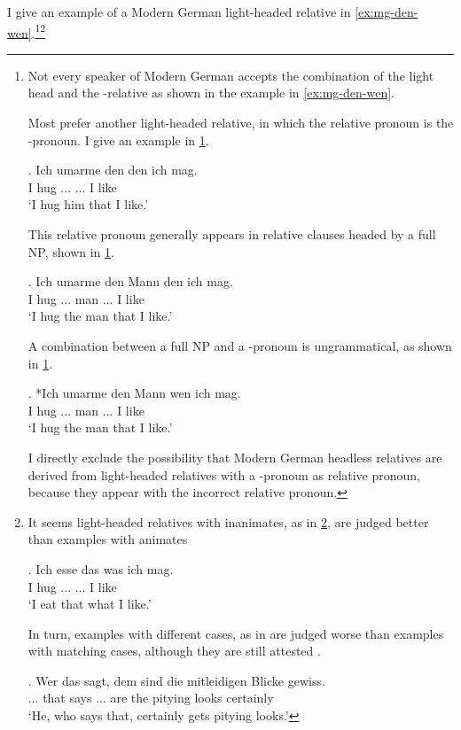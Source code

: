 I give an example of a Modern German light-headed relative in \ref{ex:mg-den-wen}.\footnote{
Not every speaker of Modern German accepts the combination of the light head  and the -relative  as shown in the example in \ref{ex:mg-den-wen}.

Most prefer another light-headed relative, in which the relative pronoun is the -pronoun. I give an example in \ref{ex:mg-den-den}.

\exg. Ich umarme den den ich mag.\\
I hug ... ... I like\\
`I hug him that I like.'\label{ex:mg-den-den}

This relative pronoun generally appears in relative clauses headed by a full NP, shown in \ref{ex:mg-den-headed}.

\exg. Ich umarme den Mann den ich mag.\\
I hug ... man ... I like\\
`I hug the man that I like.'\label{ex:mg-den-headed}

A combination between a full NP and a -pronoun is ungrammatical, as shown in \ref{ex:mg-wen-headed}.

\exg. *Ich umarme den Mann wen ich mag.\\
I hug ... man ... I like\\
`I hug the man that I like.'\label{ex:mg-wen-headed}

I directly exclude the possibility that Modern German headless relatives are derived from light-headed relatives with a -pronoun as relative pronoun, because they appear with the incorrect relative pronoun.
}\footnote{
It seems light-headed relatives with inanimates, as in \ref{ex:mg-das-was}, are judged better than examples with animates \citep[cf.][ftn. 29]{hanink2018}

\exg.
Ich esse das was ich mag.\\
I hug ... ... I like\\
`I eat that what I like.'\label{ex:mg-das-was}

In turn, examples with different cases, as in are judged worse than examples with matching cases, although they are still attested \citep[ftn. 6]{fuss2014}.

\exg.
Wer das sagt, dem sind die mitleidigen Blicke gewiss.\\
... that says ... are the pitying looks certainly\\
`He, who says that, certainly gets pitying looks.'\label{ex:mg-wer-dem}

\phantom{x}
}

